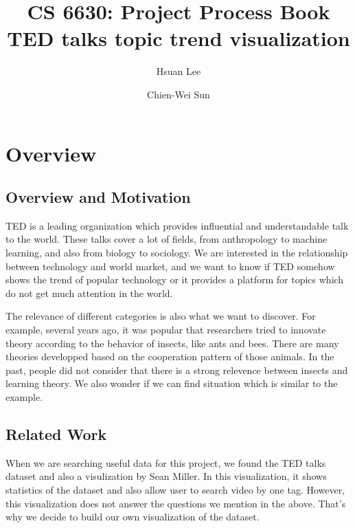 \documentclass{report}
\numberwithin{figure}{section}
\begin{document}
\title{CS 6630: Project Process Book
	\\TED talks topic trend visualization\\}
\author{Hsuan Lee}
\author{Chien-Wei Sun}

\maketitle

\tableofcontents{}
\chapter{Overview}
\section{Overview and Motivation}

\quad TED is a leading organization which provides influential and understandable talk to the world. These talks cover a lot of fields, from anthropology to machine learning, and also from biology to sociology. We are interested in the relationship between technology and world market, and we want to know if TED somehow shows the trend of popular technology or it provides a platform for topics which do not get much attention in the world. 

\quad The relevance of different categories is also what we want to discover. For example, several years ago, it was popular that researchers tried to innovate theory according to the behavior of insects, like ants and bees. There are many theories developped based on the cooperation pattern of those animals. In the past, people did not consider that there is a strong relevence between insects and learning theory. We also wonder if we can find situation which is similar to the example.

\section{Related Work}

\quad When we are searching useful data for this project, we found the TED talks dataset and also a visulization by Sean Miller\cite{prework}. In this visualization, it shows statistics of the dataset and also allow user to search video by one tag. However, this visualization does not answer the questions we mention in the above. That's why we decide to build our own visualization of the dataset.
\end{document}
